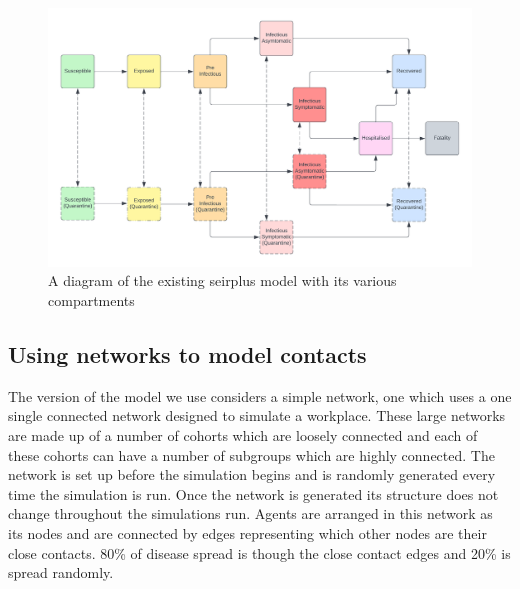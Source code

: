 \documentclass{article}
\begin{document}
\begin{figure}[h!]
\centering
\includegraphics[width=\textwidth]{SIR}
\caption{A diagram of the existing seirplus model with its various compartments ~\cite{mcgee_2021}}
\end{figure}

\newpage



\subsection{Using networks to model contacts}

The version of the model we use considers a simple network, one which uses a one single connected network designed to simulate a workplace. These large networks are made up of a number of cohorts which are loosely connected and each of these cohorts can have a number of subgroups which are highly connected. The network is set up before the simulation begins and is randomly generated every time the simulation is run. Once the network is generated its structure does not change throughout the simulations run.  Agents are arranged in this network as its nodes and are connected by edges representing which other nodes are their close contacts. 80\% of disease spread is though the close contact edges and 20\% is spread randomly.


\newpage
\end{document}
